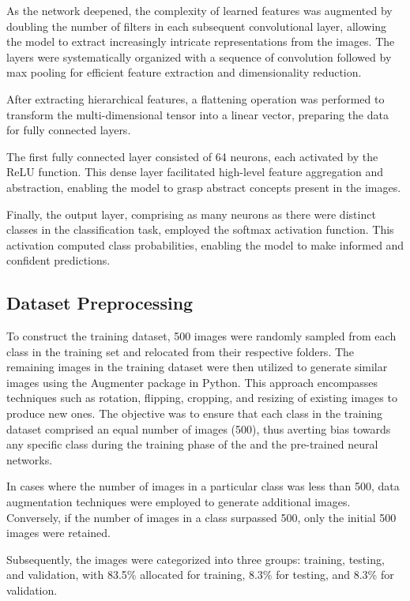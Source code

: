 \documentclass{article}
\begin{document}
As the network deepened, the complexity of learned features was augmented by doubling the number of filters in each subsequent convolutional layer, allowing the model to extract increasingly intricate representations from the images. The layers were systematically organized with a sequence of convolution followed by max pooling for efficient feature extraction and dimensionality reduction.

After extracting hierarchical features, a flattening operation was performed to transform the multi-dimensional tensor into a linear vector, preparing the data for fully connected layers.

The first fully connected layer consisted of 64 neurons, each activated by the ReLU function. This dense layer facilitated high-level feature aggregation and abstraction, enabling the model to grasp abstract concepts present in the images.

Finally, the output layer, comprising as many neurons as there were distinct classes in the classification task, employed the softmax activation function. This activation computed class probabilities, enabling the model to make informed and confident predictions.


\subsection{Dataset Preprocessing}
To construct the training dataset, 500 images were randomly sampled from each class in the training set and relocated from their respective folders. The remaining images in the training dataset were then utilized to generate similar images using the Augmenter package in Python. This approach encompasses techniques such as rotation, flipping, cropping, and resizing of existing images to produce new ones. The objective was to ensure that each class in the training dataset comprised an equal number of images (500), thus averting bias towards any specific class during the training phase of the  and the pre-trained neural networks.

In cases where the number of images in a particular class was less than 500, data augmentation techniques were employed to generate additional images. Conversely, if the number of images in a class surpassed 500, only the initial 500 images were retained.

Subsequently, the images were categorized into three groups: training, testing, and validation, with 83.5\% allocated for training, 8.3\% for testing, and 8.3\% for validation.
\end{document}
